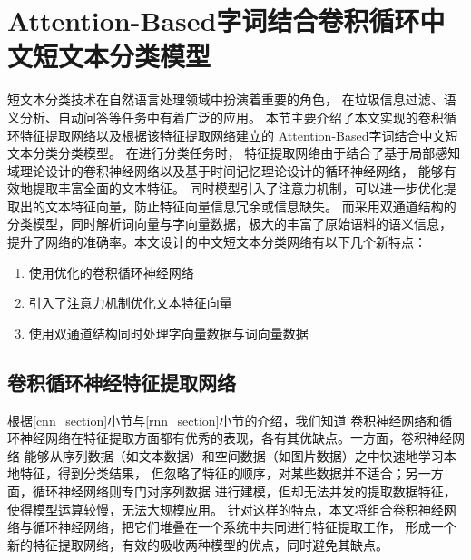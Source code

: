 \chapter{Attention-Based字词结合卷积循环中文短文本分类模型}
\label{4_section}
短文本分类技术在自然语言处理领域中扮演着重要的角色，
在垃圾信息过滤、语义分析、自动问答等任务中有着广泛的应用。
本节主要介绍了本文实现的卷积循环特征提取网络以及根据该特征提取网络建立的
Attention-Based字词结合中文短文本分类分类模型。
在进行分类任务时，
特征提取网络由于结合了基于局部感知域理论设计的卷积神经网络以及基于时间记忆理论设计的循环神经网络，
能够有效地提取丰富全面的文本特征。
同时模型引入了注意力机制，可以进一步优化提取出的文本特征向量，防止特征向量信息冗余或信息缺失。
而采用双通道结构的分类模型，同时解析词向量与字向量数据，极大的丰富了原始语料的语义信息，
提升了网络的准确率。本文设计的中文短文本分类网络有以下几个新特点：
\begin{enumerate}
    \item 使用优化的卷积循环神经网络
    \item 引入了注意力机制优化文本特征向量
    \item 使用双通道结构同时处理字向量数据与词向量数据
\end{enumerate}

\section{卷积循环神经特征提取网络}
\label{CLSTM_section}
根据\ref{cnn_section}小节与\ref{rnn_section}小节的介绍，我们知道
卷积神经网络和循环神经网络在特征提取方面都有优秀的表现，各有其优缺点。一方面，卷积神经网络
能够从序列数据（如文本数据）和空间数据（如图片数据）之中快速地学习本地特征，得到分类结果，
但忽略了特征的顺序，对某些数据并不适合；另一方面，循环神经网络则专门对序列数据
进行建模，但却无法并发的提取数据特征，使得模型运算较慢，无法大规模应用。
针对这样的特点，本文将组合卷积神经网络与循环神经网络，把它们堆叠在一个系统中共同进行特征提取工作，
形成一个新的特征提取网络，有效的吸收两种模型的优点，同时避免其缺点。
